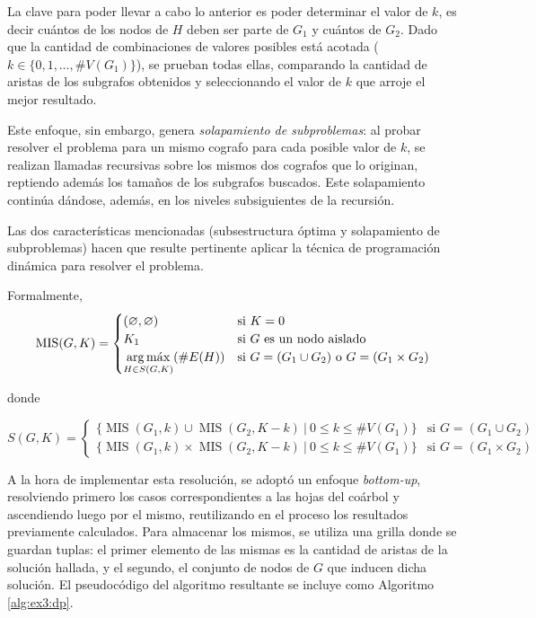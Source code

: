 \begin{enumerate}
    La clave para poder llevar a cabo lo anterior es poder determinar el valor
    de $k$, es decir cuántos de los nodos de $H$ deben ser parte de $G_1$ y
    cuántos de $G_2$. Dado que la cantidad de combinaciones de valores
    posibles está acotada ($k \in \lbrace 0, 1, \dots, \#V(G_1) \rbrace$), se
    prueban todas ellas, comparando la cantidad de aristas de los subgrafos
    obtenidos y seleccionando el valor de $k$ que arroje el mejor resultado.

    Este enfoque, sin embargo, genera \emph{solapamiento de subproblemas}: al
    probar resolver el problema para un mismo cografo para cada posible valor
    de $k$, se realizan llamadas recursivas sobre los mismos dos cografos que
    lo originan, reptiendo además los tamaños de los subgrafos buscados. Este
    solapamiento continúa dándose, además, en los niveles subsiguientes de la
    recursión.

    Las dos características mencionadas (subsestructura óptima y solapamiento
    de subproblemas) hacen que resulte pertinente aplicar la técnica de
    programación dinámica para resolver el problema.
\end{enumerate}

\bigskip

Formalmente,
\[
    \operatorname{MIS}(G, K) = \begin{cases}
        (\varnothing, \varnothing) & \text{si } K = 0 \\
        K_1 & \text{si } G \text{ es un nodo aislado} \\
        \displaystyle \argmax_{H \in S(G, K)}(\#E(H)) & \text{si } G = (G_1
        \cup G_2) \text{ o } G = (G_1 \times G_2) \\
    \end{cases}
\]

donde

\[
    S(G, K) = \begin{cases}
        \lbrace \operatorname{MIS}(G_1, k) \cup \operatorname{MIS}(G_2, K -
        k) \ \vert\ 0 \leq k \leq \#V(G_1) \rbrace & \text{si } G = (G_1 \cup G_2) \\
        \lbrace \operatorname{MIS}(G_1, k) \times \operatorname{MIS}(G_2, K -
        k) \ \vert\ 0 \leq k \leq \#V(G_1) \rbrace & \text{si } G = (G_1 \times G_2)
    \end{cases}
\]

\bigskip

A la hora de implementar esta resolución, se adoptó un enfoque \emph{bottom-up},
resolviendo primero los casos correspondientes a las hojas del coárbol y
ascendiendo luego por el mismo, reutilizando en el proceso los resultados
previamente calculados. Para almacenar los mismos, se utiliza una grilla donde
se guardan tuplas: el primer elemento de las mismas es la cantidad de aristas
de la solución hallada, y el segundo, el conjunto de nodos de $G$ que inducen
dicha solución. El pseudocódigo del algoritmo resultante se incluye como
Algoritmo \ref{alg:ex3:dp}.


